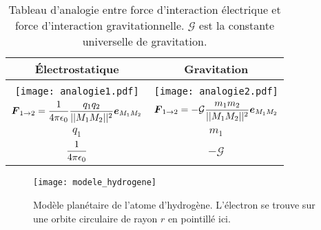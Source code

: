 \begin{table}[h!]
	\centering
	\caption{Tableau d'analogie entre force d'interaction électrique et 
	force d'interaction gravitationnelle. $\mathcal{G}$ est la constante 
	universelle de gravitation.}
	\label{tab:analogie}
	\begin{tabular}{c|c}
		Électrostatique 	&	Gravitation \\[1em] \hline \\[0.5em]
		\texttt{[image: analogie1.pdf]} & \texttt{[image: analogie2.pdf]} \\[2em]
		$\vecf_{1 \rightarrow 2} = \dfrac{1}{4\pi\epsilon_0}
	                                  \dfrac{q_1 q_2}{||M_1M_2||^2}
					  \mitbf{e}_{M_1M_2}$
					& $\vecf_{1 \rightarrow 2} = - \mathcal{G}
	                                  \dfrac{m_1 m_2}{||M_1M_2||^2}
					  \mitbf{e}_{M_1M_2}$ \\[1em]
		$q_1$			&	$m_1$ \\[1em]
		$\dfrac{1}{4\pi\epsilon_0}$		&	$-\mathcal{G}$\\
	\end{tabular}
\end{table}

\begin{figure}[h!]
	\centering
	\texttt{[image: modele\_hydrogene]}
	\caption{Modèle planétaire de l'atome d'hydrogène. L'électron 
	se trouve sur une orbite circulaire de rayon $r$ en pointillé ici.}%
	\label{fig:hydrogene}
\end{figure}

